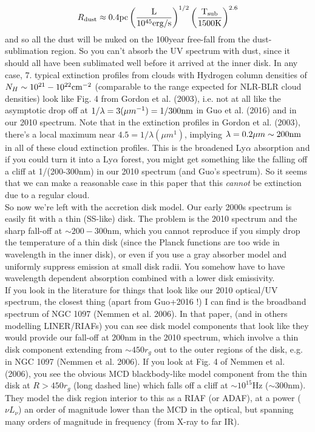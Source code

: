 \documentclass[12pt]{article}
\begin{document}
\begin{equation}
R_{\rm dust} \approx 0.4\rm{pc}\left( \frac{L}{10^{45}\rm{erg/s}}\right)^{1/2}\left(\frac{T_{\rm sub}}{1500\rm{K}}\right)^{2.6}
\end{equation}
and so all the dust will be nuked on the 100year free-fall from the dust-sublimation region. So you can't absorb the UV spectrum with dust, since it should all have been sublimated well before it arrived at the inner disk. In any case, 7. typical extinction profiles from clouds with Hydrogen column densities of $N_{H} \sim 10^{21}-10^{22} \rm{cm}^{-2}$ (comparable to the range expected for NLR-BLR cloud densities) look like Fig. 4 from Gordon et al. (2003), i.e. not at all like the asymptotic drop off at $1/\lambda=3 (\mu m^{-1})=1/300\rm{nm}$ in Guo et al. (2016) and in our 2010 spectrum. Note that in the extinction profiles in Gordon et al. (2003), there's a local maximum near $4.5=1/\lambda (\mu m^{1})$, implying $\lambda=0.2\mu m \sim 200\rm{nm}$ in all of these cloud extinction profiles. This is the broadened Ly$\alpha$ absorption and if you could turn it into a Ly$\alpha$ forest, you might get something like the falling off a cliff at 1/(200-300nm) in our 2010 spectrum (and Guo's spectrum). So it seems that we can make a reasonable case in this paper that this \emph{cannot} be extinction due to a regular cloud.\\

So now we're left with the accretion disk model. Our early 2000s spectrum is easily fit with a thin (SS-like) disk. The problem is the 2010 spectrum and the sharp fall-off at $\sim 200-300$nm, which you cannot reproduce if you simply drop the temperature of a thin disk (since the Planck functions are too wide in wavelength in the inner disk), or even if you use a gray absorber model and uniformly suppress emission at small disk radii. You somehow have to have wavelength dependent absorption combined with a lower disk emissivity.\\ 

If you look in the literature for things that look like our 2010 optical/UV spectrum, the closest thing (apart from Guo+2016 !) I can find is the broadband spectrum of NGC 1097 (Nemmen et al. 2006). In that paper, (and in others modelling LINER/RIAFs) you can see disk model components that look like they would provide our fall-off at 200nm in the 2010 spectrum, which involve a thin disk component extending from $\sim 450r_{g}$ out to the outer regions of the disk, e.g. in NGC 1097 (Nemmen et al. 2006). If you look at Fig. 4 of Nemmen et al. (2006), you see the obvious MCD blackbody-like model component from the thin disk at $R>450r_{g}$ (long dashed line) which falls off a cliff at $\sim 10^{15}$Hz ($\sim 300$nm). They model the disk region interior to this as a RIAF (or ADAF), at a power ($\nu L_{\nu}$) an order of magnitude lower than the MCD in the optical, but spanning many orders of magnitude in frequency (from X-ray to far IR).\\
\end{document}
